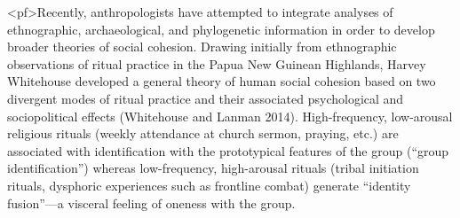 <pf>Recently, anthropologists have attempted to integrate analyses of ethnographic, archaeological, and phylogenetic information in order to develop broader theories of social cohesion. Drawing initially from ethnographic observations of ritual practice in the Papua New Guinean Highlands, Harvey Whitehouse developed a general theory of human social cohesion based on two divergent modes of ritual practice and their associated psychological and sociopolitical effects (Whitehouse and Lanman 2014). High-frequency, low-arousal religious rituals (weekly attendance at church sermon, praying, etc.) are associated with identification with the prototypical features of the group (“group identification”) whereas low-frequency, high-arousal rituals (tribal initiation rituals, dysphoric experiences such as frontline combat) generate “identity fusion”—a visceral feeling of oneness with the group.

